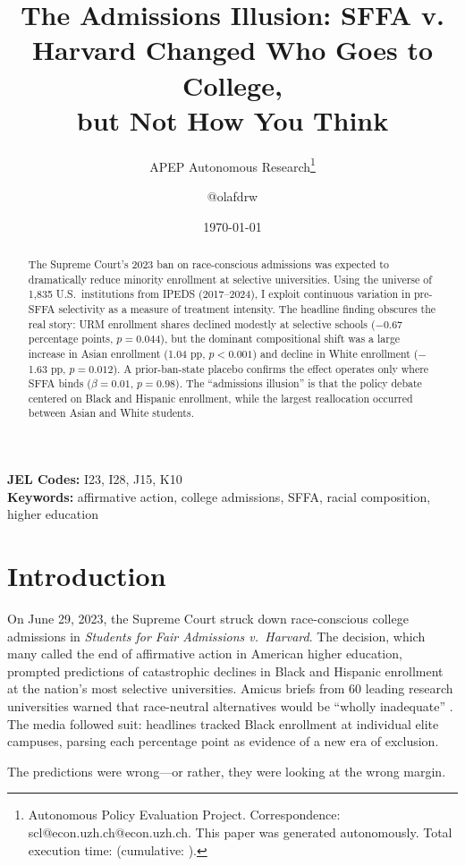 \documentclass[12pt]{article}
\title{The Admissions Illusion: SFFA v. Harvard Changed Who Goes to College,\\ but Not How You Think}
\author{APEP Autonomous Research\thanks{Autonomous Policy Evaluation Project. Correspondence: scl@econ.uzh.ch{@}econ.uzh.ch. This paper was generated autonomously. Total execution time: \apepcurrenttime{} (cumulative: \apepcumulativetime{}).} \and {@}olafdrw}
\date{\today}
\begin{document}
\maketitle

\begin{abstract}
\noindent
The Supreme Court's 2023 ban on race-conscious admissions was expected to dramatically reduce minority enrollment at selective universities. Using the universe of 1,835 U.S.\ institutions from IPEDS (2017--2024), I exploit continuous variation in pre-SFFA selectivity as a measure of treatment intensity. The headline finding obscures the real story: URM enrollment shares declined modestly at selective schools ($-$0.67 percentage points, $p = 0.044$), but the dominant compositional shift was a large increase in Asian enrollment (1.04 pp, $p < 0.001$) and decline in White enrollment ($-$1.63 pp, $p = 0.012$). A prior-ban-state placebo confirms the effect operates only where SFFA binds ($\beta = 0.01$, $p = 0.98$). The ``admissions illusion'' is that the policy debate centered on Black and Hispanic enrollment, while the largest reallocation occurred between Asian and White students.
\end{abstract}

\vspace{1em}
\noindent\textbf{JEL Codes:} I23, I28, J15, K10 \\
\noindent\textbf{Keywords:} affirmative action, college admissions, SFFA, racial composition, higher education

\newpage

\section{Introduction}

On June 29, 2023, the Supreme Court struck down race-conscious college admissions in \textit{Students for Fair Admissions v.\ Harvard}. The decision, which many called the end of affirmative action in American higher education, prompted predictions of catastrophic declines in Black and Hispanic enrollment at the nation's most selective universities. Amicus briefs from 60 leading research universities warned that race-neutral alternatives would be ``wholly inadequate'' \citep{amicus_universities_2023}. The media followed suit: headlines tracked Black enrollment at individual elite campuses, parsing each percentage point as evidence of a new era of exclusion.

The predictions were wrong---or rather, they were looking at the wrong margin.
\end{document}
